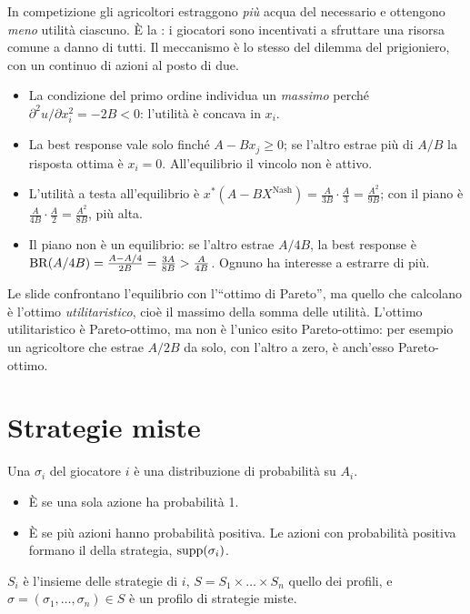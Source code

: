 In competizione gli agricoltori estraggono \emph{più} acqua del necessario e ottengono
\emph{meno} utilità ciascuno. È la : i giocatori sono
incentivati a sfruttare una risorsa comune a danno di tutti. Il meccanismo è lo stesso del
dilemma del prigioniero, con un continuo di azioni al posto di due.

\begin{extra}
\begin{itemize}
  \item La condizione del primo ordine individua un \emph{massimo} perché
        $\partial^2 u/\partial x_i^2 = -2B < 0$: l'utilità è concava in $x_i$.
  \item La best response vale solo finché $A - Bx_j \ge 0$; se l'altro estrae più di
        $A/B$ la risposta ottima è $x_i = 0$. All'equilibrio il vincolo non è attivo.
  \item L'utilità a testa all'equilibrio è $x^*(A - BX^{\text{Nash}}) =
        \tfrac{A}{3B}\cdot\tfrac{A}{3} = \tfrac{A^2}{9B}$; con il piano è
        $\tfrac{A}{4B}\cdot\tfrac{A}{2} = \tfrac{A^2}{8B}$, più alta.
  \item Il piano non è un equilibrio: se l'altro estrae $A/4B$, la best response è
        $\mathrm{BR}(A/4B) = \tfrac{A - A/4}{2B} = \tfrac{3A}{8B} > \tfrac{A}{4B}$.
        Ognuno ha interesse a estrarre di più.
\end{itemize}
\end{extra}

\begin{attenzione}
Le slide confrontano l'equilibrio con l'``ottimo di Pareto'', ma quello che calcolano è
l'ottimo \emph{utilitaristico}, cioè il massimo della somma delle utilità. L'ottimo
utilitaristico è Pareto-ottimo, ma non è l'unico esito Pareto-ottimo: per esempio
un agricoltore che estrae $A/2B$ da solo, con l'altro a zero, è anch'esso Pareto-ottimo.
\end{attenzione}

\section{Strategie miste}

\begin{definizione}
Una  $\sigma_i$ del giocatore $i$ è una distribuzione di probabilità su $A_i$.
\begin{itemize}
  \item È  se una sola azione ha probabilità 1.
  \item È  se più azioni hanno probabilità positiva. Le azioni con probabilità
        positiva formano il  della strategia, $\operatorname{supp}(\sigma_i)$.
\end{itemize}
$S_i$ è l'insieme delle strategie di $i$, $S = S_1 \times \dots \times S_n$ quello dei
profili, e $\sigma = (\sigma_1,\dots,\sigma_n) \in S$ è un profilo di strategie miste.
\end{definizione}

